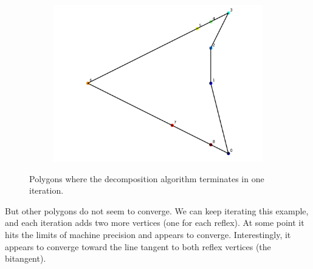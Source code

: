 \documentclass[]{article}  %
\begin{document}
\begin{figure}
\begin{subfigure}{0.6\textwidth}
  \includegraphics[width=\linewidth]{figures/iter3.png}
\end{subfigure}
\caption{Polygons where the decomposition algorithm terminates in one
iteration.}
\end{figure}

\newpage

But other polygons do not seem to converge. We can keep iterating this
example, and each iteration adds two more vertices (one for each reflex). 
At some point it hits the limits of machine precision and appears to
converge. Interestingly, it appears to converge toward the line tangent to both
reflex vertices (the bitangent).
\end{document}
